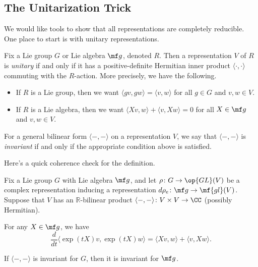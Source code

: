 \documentclass[../notes.tex]{subfiles}
\begin{document}
\subsection{The Unitarization Trick}
We would like tools to show that all representations are completely reducible. One place to start is with unitary representations.
\begin{definition}
	Fix a Lie group $G$ or Lie algebra $\mf g$, denoted $R$. Then a representation $V$ of $R$ is \textit{unitary} if and only if it has a positive-definite Hermitian inner product $\langle\cdot,\cdot\rangle$ commuting with the $R$-action. More precisely, we have the following.
	\begin{itemize}
		\item If $R$ is a Lie group, then we want $\langle gv,gw\rangle=\langle v,w\rangle$ for all $g\in G$ and $v,w\in V$.
		\item If $R$ is a Lie algebra, then we want $\langle Xv,w\rangle+\langle v,Xw\rangle=0$ for all $X\in\mf g$ and $v,w\in V$.
	\end{itemize}
	For a general bilinear form $\langle-,-\rangle$ on a representation $V$, we say that $\langle-,-\rangle$ is \textit{invariant} if and only if the appropriate condition above is satisfied.
\end{definition}
Here's a quick coherence check for the definition.
\begin{lemma} \label{lem:descend-invariant-inner-prod}
	Fix a Lie group $G$ with Lie algebra $\mf g$, and let $\rho\colon G\to\op{GL}(V)$ be a complex representation inducing a representation $d\rho_e\colon\mf g\to\mf{gl}(V)$. Suppose that $V$ has an $\mathbb R$-bilinear product $\langle-,-\rangle\colon V\times V\to\CC$ (possibly Hermitian).
	\begin{listalph}
		\item For any $X\in\mf g$, we have
		\[\frac d{dt}\langle\exp(tX)v,\exp(tX)w\rangle=\langle Xv,w\rangle+\langle v,Xw\rangle.\]
		\item If $\langle-,-\rangle$ is invariant for $G$, then it is invariant for $\mf g$.
	\end{listalph}
\end{lemma}
\end{document}
